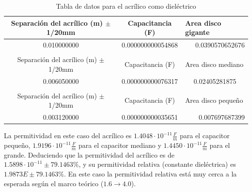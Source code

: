 \documentclass[article,12pt]{elsarticle}
\begin{document}
\begin{table}[H]
\centering
\begin{tabular}{ccl}
\hline
\multicolumn{1}{|c|}{Separación del acrílico (m) $\pm$ 1/20mm} & \multicolumn{1}{c|}{Capacitancia (F)}  & \multicolumn{1}{l|}{Area disco gigante} \\ \hline
\multicolumn{1}{|c|}{0.010000000}                              & \multicolumn{1}{c|}{0.000000000054868} & \multicolumn{1}{r|}{0.0390570652676}    \\ \hline
\multicolumn{1}{l}{}                                           & \multicolumn{1}{l}{}                   &                                         \\ \hline
\multicolumn{1}{|c|}{Separación del acrílico (m) $\pm$ 1/20mm} & \multicolumn{1}{c|}{Capacitancia (F)}  & \multicolumn{1}{l|}{Area disco mediano} \\ \hline
\multicolumn{1}{|c|}{0.006050000}                              & \multicolumn{1}{c|}{0.000000000076317} & \multicolumn{1}{c|}{0.02405281875}      \\ \hline
\multicolumn{1}{l}{}                                           & \multicolumn{1}{l}{}                   &                                         \\ \hline
\multicolumn{1}{|c|}{Separación del acrílico (m) $\pm$ 1/20mm} & \multicolumn{1}{c|}{Capacitancia (F)}  & \multicolumn{1}{l|}{Area disco pequeño} \\ \hline
\multicolumn{1}{|c|}{0.003120000}                              & \multicolumn{1}{c|}{0.000000000035651} & \multicolumn{1}{r|}{0.007697687399}     \\ \hline
\end{tabular}
\caption{Tabla de datos para el acrílico como dieléctrico}
\end{table}

La permitividad en este caso del acrílico es $1.4048 \cdot 10^{-11} \frac{F}{m}$ para el capacitor pequeño, $1.9196 \cdot 10^{-11} \frac{F}{m}$ para el capacitor mediano y $1.4450 \cdot 10^{-11}\frac{F}{m}$ para el grande. Deduciendo que la permitividad del acrílico es de $1.5898 \cdot 10^{-11} \pm 79.1463\%$, y su permitividad relativa (constante dieléctrica) es $1.9873E \pm 79.1463 \%$. En este caso la permitividad relativa está muy cerca a la esperada según el marco teórico ($1.6 \rightarrow 4.0$).
\end{document}
